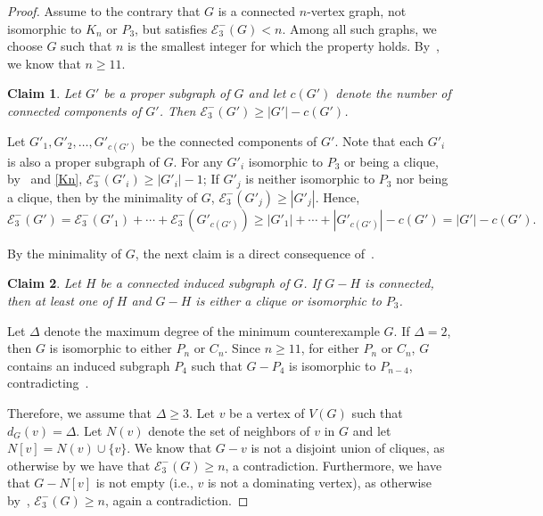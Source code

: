\documentclass[a4paper,12pt]{article}
\theoremstyle{plain}
\newtheorem{claim}{Claim}[section]
\newenvironment{proof*}{\noindent \emph{Proof of the claim.}}{\hfill$\Diamond$}
\begin{document}
\begin{proof}
Assume to the contrary that $G$ is a connected $n$-vertex graph, not isomorphic to $K_n$ or $P_3$, but satisfies $\mathcal{E}_3^{-}(G) < n.$ Among all such graphs, we choose $G$ such that $n$ is the smallest integer for which the property holds. By~, we know that $n\geq 11$. 


\begin{claim}\label{claim:connected-components}
Let $G'$ be a proper subgraph of $G$ and let $c(G')$ denote the number of connected components of $G'$. Then $\mathcal{E}_3^{-}(G') \geq |G'|-c(G')$.
\end{claim}

\begin{proof*}
Let $G'_1,G'_2,\ldots, G'_{c(G')}$ be the connected components of $G'$. Note that each $G'_i$ is also a proper subgraph of $G$. For any $G'_i$ isomorphic to $P_3$ or being a clique, by~ and \ref{Kn}, $\mathcal{E}_3^{-}(G'_i)\geq |G'_i|-1$; If $G'_j$ is neither isomorphic to $P_3$ nor being a clique, then by the minimality of $G$, $\mathcal{E}_3^{-}(G'_j)\geq |G'_j|$. Hence, $\mathcal{E}_3^{-}(G')=\mathcal{E}_3^{-}(G'_1)+\cdots +\mathcal{E}_3^{-}(G'_{c(G')})\geq |G'_1|+\cdots +|G'_{c(G')}|-c(G')=|G'|-c(G').$
\end{proof*}  

\medskip
By the minimality of $G$, the next claim is a direct consequence of~. 

\begin{claim}\label{claim:H+G-H}
Let $H$ be a connected induced subgraph of $G$. If $G-H$ is connected, then at least one of $H$ and $G-H$ is either a clique or isomorphic to $P_3$. 
\end{claim} 

Let $\Delta$ denote the maximum degree of the minimum counterexample $G$. If $\Delta=2$, then $G$ is isomorphic to either $P_n$ or $C_n$. Since $n \geq 11$, for either $P_n$ or $C_n$, $G$ contains an induced subgraph $P_4$ such that $G-P_4$ is isomorphic to $P_{n-4}$, contradicting~.

Therefore, we assume that $\Delta \geq 3$. Let $v$ be a vertex of $V(G)$ such that $d_G(v) = \Delta$. Let $N(v)$ denote the set of neighbors of $v$ in $G$ and let $N[v]=N(v)\cup \{v\}$. We know that $G-v$ is not a disjoint union of cliques, as otherwise by  we have that $\mathcal{E}_3^{-}(G) \geq n$, a contradiction. Furthermore, we have that $G-N[v]$ is not empty (i.e., $v$ is not a dominating vertex), as otherwise by~, $\mathcal{E}_3^{-}(G) \geq n$, again a contradiction. 




\end{proof}
\end{document}
